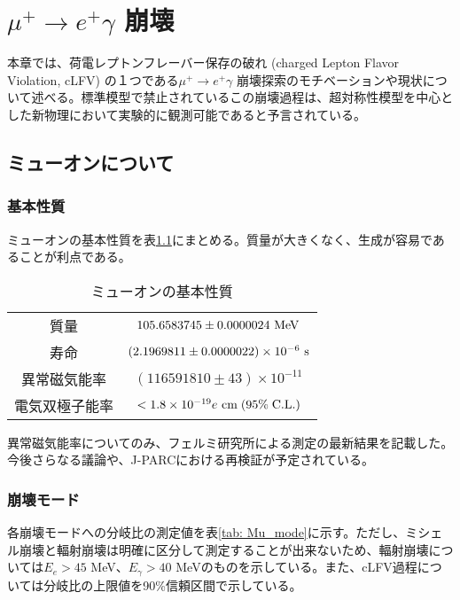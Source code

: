 \documentclass[Yonemoto_master.tex]{subfiles}
\begin{document}
\chapter{$\mu^+ \to e^+ \gamma$ 崩壊}
本章では、荷電レプトンフレーバー保存の破れ (charged Lepton Flavor Violation, cLFV) の１つである$\mu^+ \to e^+ \gamma$ 崩壊探索のモチベーションや現状について述べる。標準模型で禁止されているこの崩壊過程は、超対称性模型を中心とした新物理において実験的に観測可能であると予言されている。

\section{ミューオンについて}
\subsection{基本性質}
ミューオンの基本性質を表\ref{tab: Mu_prop}にまとめる。質量が大きくなく、生成が容易であることが利点である。\\

\begin{table}[h]
 \centering
 \caption{ミューオンの基本性質 \cite{muon}}
 \label{tab: Mu_prop}
  \begin{tabular}{cc}
   \hline
   質量 & $105.6583745 \pm 0.0000024 \ {\rm MeV}$ \\
   寿命 & $(2.1969811 \pm 0.0000022) \times 10^{-6} \ {\rm s}$ \\ 
   異常磁気能率 & $(116591810 \pm 43) \times 10^{-11} $ \cite{fermi_g2}\\
   電気双極子能率 & $< 1.8 \times 10^{-19} e \ {\rm cm} \; (95\% \; {\rm C.L.})$ \\
   \hline
  \end{tabular}
\end{table}

異常磁気能率についてのみ、フェルミ研究所による測定の最新結果を記載した。今後さらなる議論や、J-PARCにおける再検証が予定されている\cite{jparc_g2}。

\subsection{崩壊モード}
各崩壊モードへの分岐比の測定値を表\ref{tab: Mu_mode}に示す。ただし、ミシェル崩壊と輻射崩壊は明確に区分して測定することが出来ないため、輻射崩壊については$E_e > 45$ MeV、$E_\gamma > 40$ MeVのものを示している。また、cLFV過程については分岐比の上限値を90\%信頼区間で示している。\\
\end{document}
